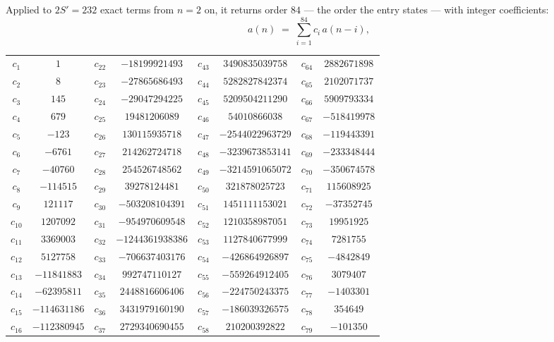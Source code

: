 \documentclass[11pt,a4paper]{article}
\theoremstyle{plain}
\theoremstyle{definition}
\begin{document}
Applied to $2S'=232$ exact terms from $n=2$ on, it returns order $84$ --- the
order the entry states --- with integer coefficients:
\[
a(n)\;=\;\sum_{i=1}^{84}c_i\,a(n-i),
\]
\begin{center}\small
\begin{tabular}{cccccccc}
$c_{1}$ & $1$ & $c_{22}$ & $-18199921493$ & $c_{43}$ & $3490835039758$ & $c_{64}$ & $2882671898$ \\
$c_{2}$ & $8$ & $c_{23}$ & $-27865686493$ & $c_{44}$ & $5282827842374$ & $c_{65}$ & $2102071737$ \\
$c_{3}$ & $145$ & $c_{24}$ & $-29047294225$ & $c_{45}$ & $5209504211290$ & $c_{66}$ & $5909793334$ \\
$c_{4}$ & $679$ & $c_{25}$ & $19481206089$ & $c_{46}$ & $54010866038$ & $c_{67}$ & $-518419978$ \\
$c_{5}$ & $-123$ & $c_{26}$ & $130115935718$ & $c_{47}$ & $-2544022963729$ & $c_{68}$ & $-119443391$ \\
$c_{6}$ & $-6761$ & $c_{27}$ & $214262724718$ & $c_{48}$ & $-3239673853141$ & $c_{69}$ & $-233348444$ \\
$c_{7}$ & $-40760$ & $c_{28}$ & $254526748562$ & $c_{49}$ & $-3214591065072$ & $c_{70}$ & $-350674578$ \\
$c_{8}$ & $-114515$ & $c_{29}$ & $39278124481$ & $c_{50}$ & $321878025723$ & $c_{71}$ & $115608925$ \\
$c_{9}$ & $121117$ & $c_{30}$ & $-503208104391$ & $c_{51}$ & $1451111153021$ & $c_{72}$ & $-37352745$ \\
$c_{10}$ & $1207092$ & $c_{31}$ & $-954970609548$ & $c_{52}$ & $1210358987051$ & $c_{73}$ & $19951925$ \\
$c_{11}$ & $3369003$ & $c_{32}$ & $-1244361938386$ & $c_{53}$ & $1127840677999$ & $c_{74}$ & $7281755$ \\
$c_{12}$ & $5127758$ & $c_{33}$ & $-706637403176$ & $c_{54}$ & $-426864926897$ & $c_{75}$ & $-4842849$ \\
$c_{13}$ & $-11841883$ & $c_{34}$ & $992747110127$ & $c_{55}$ & $-559264912405$ & $c_{76}$ & $3079407$ \\
$c_{14}$ & $-62395811$ & $c_{35}$ & $2448816606406$ & $c_{56}$ & $-224750243375$ & $c_{77}$ & $-1403301$ \\
$c_{15}$ & $-114631186$ & $c_{36}$ & $3431979160190$ & $c_{57}$ & $-186039326575$ & $c_{78}$ & $354649$ \\
$c_{16}$ & $-112380945$ & $c_{37}$ & $2729340690455$ & $c_{58}$ & $210200392822$ & $c_{79}$ & $-101350$ \\

\end{tabular}
\end{center}
\end{document}
